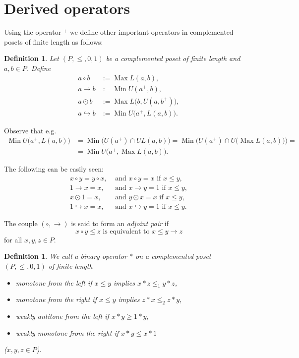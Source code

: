 \documentclass[12pt]{article}
\DeclareMathOperator{\Max}{Max}
\DeclareMathOperator{\Min}{Min}
\newtheorem{definition}[theorem]{Definition}
\begin{document}
\section{Derived operators}

Using the operator $^+$ we define other important operators in complemented posets of finite length as follows:

\begin{definition}
Let $(P,\le,0,1)$ be a complemented poset of finite length and $a,b\in P$. Define
\begin{align*}
          a\circ b & :=\Max L(a,b), \\
            a\to b & :=\Min U(a^+,b), \\
          a\odot b & :=\Max L\big(b,U(a,b^+)\big), \\
a\hookrightarrow b & :=\Min U\big(a^+,L(a,b)\big).
\end{align*}
\end{definition}

Observe that e.g.
\begin{align*}
\Min U\big(a^+,L(a,b)\big) & =\Min\big(U(a^+)\cap UL(a,b)\big)=\Min\Big(U(a^+)\cap U\big(\Max L(a,b)\big)\Big)= \\
                           & =\Min U\big(a^+,\Max L(a,b)\big).
\end{align*}

The following can be easily seen:
\begin{align*}
   x\circ y=y\circ x, & \text{ and }x\circ y=x\text{ if }x\le y, \\
            1\to x=x, & \text{ and }x\to y=1\text{ if }x\le y, \\
           x\odot1=x, & \text{ and }y\odot x=x\text{ if }x\le y, \\
1\hookrightarrow x=x, & \text{ and }x\hookrightarrow y=1\text{ if }x\le y.
\end{align*}

The couple $(\circ,\to)$ is said to form an {\em adjoint pair} if
\[
x\circ y\le z\text{ is equivalent to }x\le y\to z
\]
for all $x,y,z\in P$.

\begin{definition}
We call a binary operator $*$ on a complemented poset $(P,\le,0,1)$ of finite length
\begin{itemize}
\item {\em monotone from the left} if $x\le y$ implies $x*z\le_1y*z$,
\item {\em monotone from the right} if $x\le y$ implies $z*x\le_2z*y$,
\item {\em weakly antitone from the left} if $x*y\ge1*y$,
\item {\em weakly monotone from the right} if $x*y\le x*1$
\end{itemize}
{\rm(}$x,y,z\in P${\rm)}.
\end{definition}
\end{document}
